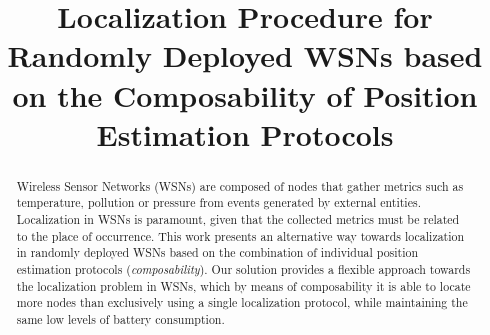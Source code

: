 \documentclass[conference]{IEEEtran}
\begin{document}
 \title{Localization Procedure for Randomly Deployed WSNs based on the Composability of Position Estimation Protocols}


  \author{
  }


\IEEEoverridecommandlockouts
{}
\maketitle

\begin{abstract}
\boldmath Wireless Sensor Networks (WSNs) are composed of nodes that gather metrics such as temperature, pollution or pressure from events generated by external entities. Localization in WSNs is paramount, given that the collected metrics must be related to the place of occurrence. This work presents an alternative way towards localization in randomly deployed WSNs based on the combination of individual position estimation protocols (\emph{composability}). Our solution provides a flexible approach towards the localization problem in WSNs, which by means of composability it is able to locate more nodes than exclusively using a single localization protocol, while maintaining the same low levels of battery consumption.


\end{abstract}
\end{document}
